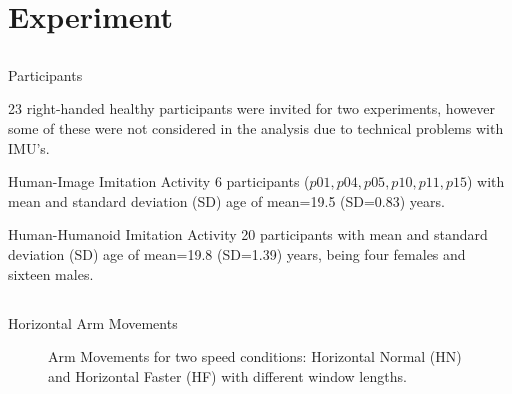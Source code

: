 
\section{Experiment}

\subsection{}
{

\begin{frame}{Participants}

23 right-handed healthy participants were invited for two experiments, 
however some of these were not considered in the analysis 
due to technical problems with IMU's.

\begin{block}{Human-Image Imitation Activity}
6 participants ($p01, p04, p05, p10, p11, p15$) 
with mean and standard deviation (SD) age of mean=19.5 (SD=0.83) years. 
\end{block}

\begin{block}{Human-Humanoid Imitation Activity}
20 participants with mean and standard deviation (SD) age of mean=19.8 (SD=1.39) years,
being four females and sixteen males.
\end{block}



\end{frame}
}


\subsection{}
{

\begin{frame}{Horizontal Arm Movements}
    \begin{figure}
	\caption[PA]{
		Arm Movements for two speed conditions:
		 Horizontal Normal (HN) and Horizontal Faster (HF) 
		with different window lengths.
		}
   \end{figure}
	
\end{frame}
}



